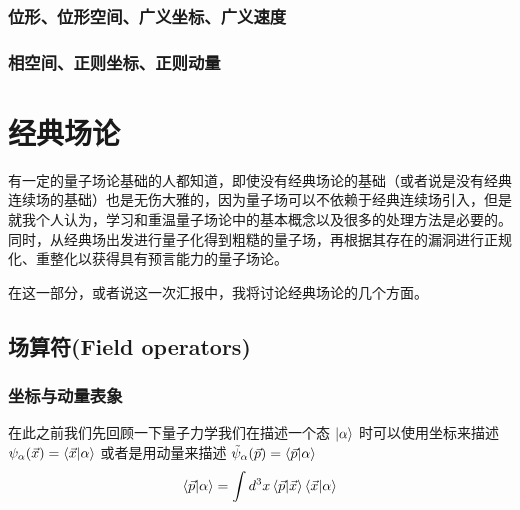 \documentclass{article}
\begin{document}
\subsubsection{位形、位形空间、广义坐标、广义速度}




\subsubsection{相空间、正则坐标、正则动量}
































\section{经典场论}
有一定的量子场论基础的人都知道，即使没有经典场论的基础（或者说是没有经典连续场的基础）也是无伤大雅的，因为量子场可以不依赖于经典连续场引入，但是就我个人认为，学习和重温量子场论中的基本概念以及很多的处理方法是必要的。同时，从经典场出发进行量子化得到粗糙的量子场，再根据其存在的漏洞进行正规化、重整化以获得具有预言能力的量子场论。

在这一部分，或者说这一次汇报中，我将讨论经典场论的几个方面。



\subsection{场算符(Field operators)}

\subsubsection{坐标与动量表象}
在此之前我们先回顾一下量子力学我们在描述一个态 $\ket{\alpha}$ 时可以使用坐标来描述 $\psi_\alpha(\vec{x}) = \braket{\vec{x}}{\alpha}$ 或者是用动量来描述 $\tilde{\psi}_\alpha(\vec{p}) = \braket{\vec{p}}{\alpha}$ 
\begin{equation*}
    \braket{\vec{p}}{\alpha} = \int d^3 x \braket{\vec{p}}{\vec{x}}\braket{\vec{x}}{\alpha}
\end{equation*}
\end{document}
